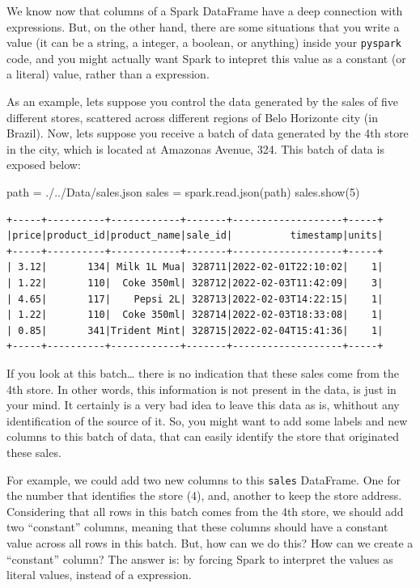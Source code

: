 \documentclass[
  11pt,
  letterpaper,
  DIV=11,
  numbers=noendperiod]{scrreprt}
\newenvironment{Shaded}{\begin{snugshade}}{\end{snugshade}}
\newcommand{\DecValTok}[1]{\textcolor[rgb]{0.68,0.00,0.00}{#1}}
\newcommand{\NormalTok}[1]{\textcolor[rgb]{0.00,0.23,0.31}{#1}}
\newcommand{\OperatorTok}[1]{\textcolor[rgb]{0.37,0.37,0.37}{#1}}
\newcommand{\StringTok}[1]{\textcolor[rgb]{0.13,0.47,0.30}{#1}}
\begin{document}
We know now that columns of a Spark DataFrame have a deep connection
with expressions. But, on the other hand, there are some situations that
you write a value (it can be a string, a integer, a boolean, or
anything) inside your \texttt{pyspark} code, and you might actually want
Spark to intepret this value as a constant (or a literal) value, rather
than a expression.

As an example, lets suppose you control the data generated by the sales
of five different stores, scattered across different regions of Belo
Horizonte city (in Brazil). Now, lets suppose you receive a batch of
data generated by the 4th store in the city, which is located at
Amazonas Avenue, 324. This batch of data is exposed below:

\begin{Shaded}
\begin{Highlighting}[]
\NormalTok{path }\OperatorTok{=} \StringTok{\textquotesingle{}./../Data/sales.json\textquotesingle{}}
\NormalTok{sales }\OperatorTok{=}\NormalTok{ spark.read.json(path)}
\NormalTok{sales.show(}\DecValTok{5}\NormalTok{)}
\end{Highlighting}
\end{Shaded}

\begin{verbatim}
+-----+----------+------------+-------+-------------------+-----+
|price|product_id|product_name|sale_id|          timestamp|units|
+-----+----------+------------+-------+-------------------+-----+
| 3.12|       134| Milk 1L Mua| 328711|2022-02-01T22:10:02|    1|
| 1.22|       110|  Coke 350ml| 328712|2022-02-03T11:42:09|    3|
| 4.65|       117|    Pepsi 2L| 328713|2022-02-03T14:22:15|    1|
| 1.22|       110|  Coke 350ml| 328714|2022-02-03T18:33:08|    1|
| 0.85|       341|Trident Mint| 328715|2022-02-04T15:41:36|    1|
+-----+----------+------------+-------+-------------------+-----+
\end{verbatim}

If you look at this batch\ldots{} there is no indication that these
sales come from the 4th store. In other words, this information is not
present in the data, is just in your mind. It certainly is a very bad
idea to leave this data as is, whithout any identification of the source
of it. So, you might want to add some labels and new columns to this
batch of data, that can easily identify the store that originated these
sales.

For example, we could add two new columns to this \texttt{sales}
DataFrame. One for the number that identifies the store (4), and,
another to keep the store address. Considering that all rows in this
batch comes from the 4th store, we should add two ``constant'' columns,
meaning that these columns should have a constant value across all rows
in this batch. But, how can we do this? How can we create a ``constant''
column? The answer is: by forcing Spark to interpret the values as
literal values, instead of a expression.
\end{document}
